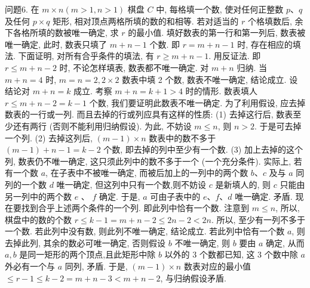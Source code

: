 问题6. 在 $m \times n(m>1, n>1)$ 棋盘 $C$ 中, 每格填一个数, 使对任何正整数 $p 、 q$ 及任何 $p \times q$ 矩形, 相对顶点两格所填的数的和相等.
若对适当的 $r$ 个格填数后, 余下各格所填的数被唯一确定, 求 $r$ 的最小值.
填好数表的第一行和第一列后, 数表被唯一确定, 此时, 数表只填了 $m+n-1$ 个数.
即 $r=m+n-1$ 时, 存在相应的填法.
下面证明, 对所有合乎条件的填法, 有 $r \geqslant m+n-1$. 用反证法.
即 $r \leqslant m+n-2$ 时, 不论怎样填表, 数表都不唯一确定.
对 $m+n$ 归纳.
当 $m+n=4$ 时, $m=n=2,2 \times 2$ 数表中填 2 个数, 数表不唯一确定, 结论成立.
设结论对 $m+n=k$ 成立.
考察 $m+n= k+1>4$ 时的情形.
数表填人 $r \leqslant m+n-2=k-1$ 个数, 我们要证明此数表不唯一确定.
为了利用假设, 应去掉数表的一行或一列.
而且去掉的行或列应具有这样的性质: (1) 去掉这行后, 数表至少还有两行 (否则不能利用归纳假设). 为此, 不妨设 $m \leqslant n$, 则 $n>2$. 于是可去掉一个列.
(2) 去掉这列后, $(m-1) \times n$ 数表中的数不多于 $(m-1)+n-1=k-2$ 个数, 即去掉的列中至少有一个数.
(3) 加上去掉的这个列, 数表仍不唯一确定, 这只须此列中的数不多于一个 (一个充分条件). 实际上, 若有一个数 $a$, 在子表中不被唯一确定, 而被后加上的一列中的两个数 $b 、 c$ 及与 $a$ 同列的一个数 $d$ 唯一确定, 但这列中只有一个数,则不妨设 $c$ 是新填人的, 则 $c$ 只能由另一列中的两个数 $e$ 、 $f$ 确定.
于是, $a$ 可由子表中的 $e 、 f 、 d$ 唯一确定.
矛盾.
现在要找到合乎上述两个条件的一个列.
即此列中恰有一个数.
注意到 $m \leqslant n$, 所以, 棋盘中的数的个数 $r \leqslant k-1=m+n-2 \leqslant 2 n-2<2 n$. 所以, 至少有一列不多于一个数.
若此列中没有数, 则此列不唯一确定, 结论成立.
若此列中恰有一个数 $a$, 则去掉此列, 其余的数必可唯一确定, 否则假设 $b$ 不唯一确定, 则 $b$ 要由 $a$ 确定, 从而 $a, b$ 是同一矩形的两个顶点,且此矩形中除 $b$ 以外的 3 个数都已知, 这 3 个数中除 $a$ 外必有一个与 $a$ 同列, 矛盾.
于是, $(m-1) \times n$ 数表对应的最小值 $\leqslant r-1 \leqslant k-2=m+n-3<m+n-2$, 与归纳假设矛盾.


